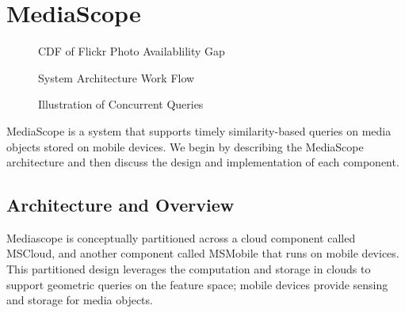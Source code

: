 \section{MediaScope}
\label{sec-3}

\begin{figure}[t]
  \begin{minipage}{0.32\linewidth}
    \centering {}
    \caption{CDF of Flickr Photo Availablility Gap}
    \label{fig:cdf}
  \end{minipage}
  \begin{minipage}{0.32\linewidth}
    \begin{center}
    \end{center}
    \caption{System Architecture Work Flow}
    \label{fig:architecture}
  \end{minipage}
  \begin{minipage}{0.32\linewidth}
      \begin{center}
      \end{center}
      \caption{Illustration of Concurrent Queries}
      \label{fig:example}
    \end{minipage}
\end{figure}

MediaScope is a system that supports timely similarity-based queries
on media objects stored on mobile devices.
%
We begin by describing the MediaScope architecture and then discuss
the design and implementation of each component.

\subsection{Architecture and Overview}
\label{sec-3-1}

Mediascope is conceptually partitioned across a cloud component called
MSCloud, and another component called MSMobile that runs on mobile devices.
%
This partitioned design leverages the computation and storage in
clouds to support geometric queries on the feature space; mobile
devices provide sensing and storage for media objects.

